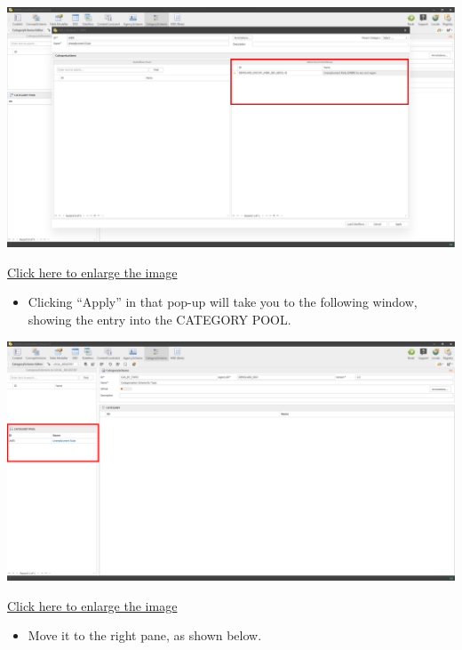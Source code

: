 \documentclass[
]{book}
\providecommand{\tightlist}{%
  \setlength{\itemsep}{0pt}\setlength{\parskip}{0pt}}
\begin{document}
\begin{center}\includegraphics[width=1\linewidth]{./images/image176} \end{center}

\href{images/image176.png}{Click here to enlarge the image}

\begin{itemize}
\tightlist
\item
  Clicking ``Apply'' in that pop-up will take you to the following window, showing the entry into the CATEGORY POOL.
\end{itemize}

\begin{center}\includegraphics[width=1\linewidth]{./images/image178} \end{center}

\href{images/image178.png}{Click here to enlarge the image}

\begin{itemize}
\tightlist
\item
  Move it to the right pane, as shown below.
\end{itemize}
\end{document}
